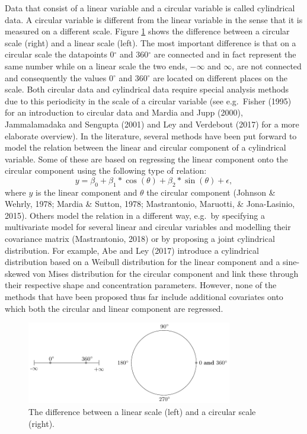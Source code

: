\documentclass[man]{apa6}
\begin{document}
Data that consist of a linear variable and a circular variable is called
cylindrical data. A circular variable is different from the linear variable in
the sense that it is measured on a different scale. Figure \ref{circline} shows
the difference between a circular scale (right) and a linear scale (left). The
most important difference is that on a circular scale the datapoints 0\(^\circ\)
and 360\(^\circ\) are connected and in fact represent the same number while on a
linear scale the two ends, \(-\infty\) and \(\infty\), are not connected and
consequently the values 0\(^\circ\) and 360\(^\circ\) are located on different
places on the scale. Both circular data and cylindrical data require special
analysis methods due to this periodicity in the scale of a circular variable
(see e.g.~Fisher (1995) for an introduction to circular data and
Mardia and Jupp (2000), Jammalamadaka and Sengupta (2001) and Ley and Verdebout (2017) for a more
elaborate overview).\newline
\indent In the literature, several methods have been put forward to model the
relation between the linear and circular component of a cylindrical variable.
Some of these are based on regressing the linear component onto the circular
component using the following type of relation: \[y = \beta_0 +
\beta_1*\cos(\theta) + \beta_2*\sin(\theta)+ \epsilon,\] where \(y\) is the
linear component and \(\theta\) the circular component (Johnson \& Wehrly, 1978; Mardia \& Sutton, 1978; Mastrantonio, Maruotti, \& Jona-Lasinio, 2015). Others model the relation in a
different way, e.g.~by specifying a multivariate model for several linear and
circular variables and modelling their covariance matrix
(Mastrantonio, 2018) or by proposing a joint cylindrical distribution. For
example, Abe and Ley (2017) introduce a cylindrical distribution based on a
Weibull distribution for the linear component and a sine-skewed von Mises
distribution for the circular component and link these through their respective
shape and concentration parameters. However, none of the methods that have been
proposed thus far include additional covariates onto which both the circular and
linear component are regressed.

\begin{figure}
\centering
\includegraphics[width = 0.8\textwidth]{Plots/circline.pdf}
\caption{The difference between a linear scale (left) and a circular scale (right).}
\label{circline}
\end{figure}
\end{document}
